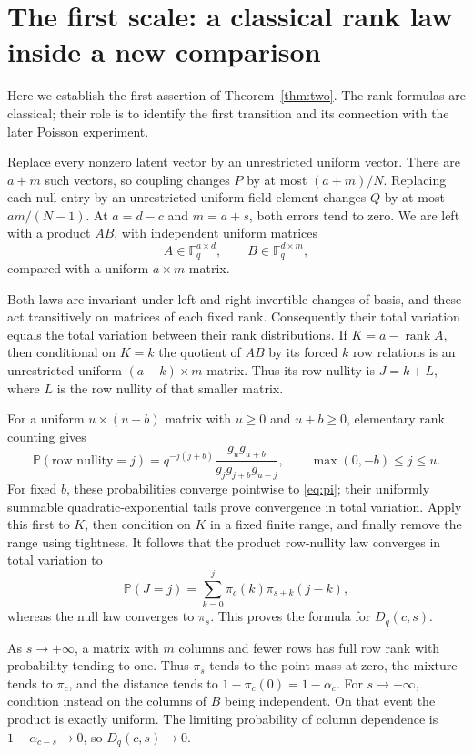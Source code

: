 \documentclass[11pt]{article}
\theoremstyle{remark}\newtheorem{remark}[theorem]{Remark}
\newcommand{\F}{\mathbb F_q}
\newcommand{\Pp}{\mathbb P}
\newcommand{\rank}{\operatorname{rank}}
\begin{document}
\section{The first scale: a classical rank law inside a new comparison}
Here we establish the first assertion of Theorem~\ref{thm:two}. The rank formulas are classical; their role is to identify the first transition and its connection with the later Poisson experiment.

Replace every nonzero latent vector by an unrestricted uniform vector. There are $a+m$ such vectors, so coupling changes $P$ by at most $(a+m)/N$. Replacing each null entry by an unrestricted uniform field element changes $Q$ by at most $am/(N-1)$. At $a=d-c$ and $m=a+s$, both errors tend to zero. We are left with a product $AB$, with independent uniform matrices
\[
 A\in\F^{a\times d},\qquad B\in\F^{d\times m},
\]
compared with a uniform $a\times m$ matrix.

Both laws are invariant under left and right invertible changes of basis, and these act transitively on matrices of each fixed rank. Consequently their total variation equals the total variation between their rank distributions. If $K=a-\rank A$, then conditional on $K=k$ the quotient of $AB$ by its forced $k$ row relations is an unrestricted uniform $(a-k)\times m$ matrix. Thus its row nullity is $J=k+L$, where $L$ is the row nullity of that smaller matrix.

For a uniform $u\times(u+b)$ matrix with $u\ge0$ and $u+b\ge0$, elementary rank counting gives
\begin{equation}\label{eq:finite-pi}
 \Pp(\text{row nullity}=j)
 =q^{-j(j+b)}\frac{g_ug_{u+b}}{g_jg_{j+b}g_{u-j}},
 \qquad \max(0,-b)\le j\le u.
\end{equation}
For fixed $b$, these probabilities converge pointwise to \eqref{eq:pi}; their uniformly summable quadratic-exponential tails prove convergence in total variation. Apply this first to $K$, then condition on $K$ in a fixed finite range, and finally remove the range using tightness. It follows that the product row-nullity law converges in total variation to
\[
 \Pp(J=j)=\sum_{k=0}^j\pi_c(k)\pi_{s+k}(j-k),
\]
whereas the null law converges to $\pi_s$. This proves the formula for $D_q(c,s)$.

As $s\to+\infty$, a matrix with $m$ columns and fewer rows has full row rank with probability tending to one. Thus $\pi_s$ tends to the point mass at zero, the mixture tends to $\pi_c$, and the distance tends to $1-\pi_c(0)=1-\alpha_c$. For $s\to-\infty$, condition instead on the columns of $B$ being independent. On that event the product is exactly uniform. The limiting probability of column dependence is $1-\alpha_{c-s}\to0$, so $D_q(c,s)\to0$.
\end{document}
